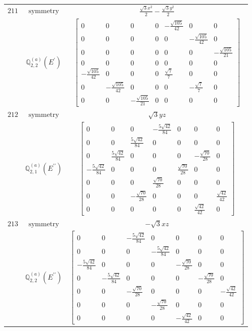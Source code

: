 \documentclass[fleqn,8pt,landscape]{jsarticle}
\begin{document}
\begin{longtable}{ccc}
$ 211 $ & $ \text{symmetry} $ & $ \frac{\sqrt{3} x^{2}}{2} - \frac{\sqrt{3} y^{2}}{2} $ \\
$  $ & $ \mathbb{Q}_{2,2}^{(a)}(E^{\prime}) $ & $ \begin{bmatrix} 0 & 0 & 0 & 0 & - \frac{\sqrt{105}}{42} & 0 & 0 \\ 0 & 0 & 0 & 0 & 0 & - \frac{\sqrt{105}}{42} & 0 \\ 0 & 0 & 0 & 0 & 0 & 0 & - \frac{\sqrt{105}}{21} \\ 0 & 0 & 0 & 0 & 0 & 0 & 0 \\ - \frac{\sqrt{105}}{42} & 0 & 0 & 0 & \frac{\sqrt{7}}{7} & 0 & 0 \\ 0 & - \frac{\sqrt{105}}{42} & 0 & 0 & 0 & - \frac{\sqrt{7}}{7} & 0 \\ 0 & 0 & - \frac{\sqrt{105}}{21} & 0 & 0 & 0 & 0 \end{bmatrix} $ \\ \hline
$ 212 $ & $ \text{symmetry} $ & $ \sqrt{3} y z $ \\
$  $ & $ \mathbb{Q}_{2,1}^{(a)}(E^{\prime\prime}) $ & $ \begin{bmatrix} 0 & 0 & 0 & - \frac{5 \sqrt{42}}{84} & 0 & 0 & 0 \\ 0 & 0 & \frac{5 \sqrt{42}}{84} & 0 & 0 & 0 & 0 \\ 0 & \frac{5 \sqrt{42}}{84} & 0 & 0 & 0 & - \frac{\sqrt{70}}{28} & 0 \\ - \frac{5 \sqrt{42}}{84} & 0 & 0 & 0 & \frac{\sqrt{70}}{28} & 0 & 0 \\ 0 & 0 & 0 & \frac{\sqrt{70}}{28} & 0 & 0 & 0 \\ 0 & 0 & - \frac{\sqrt{70}}{28} & 0 & 0 & 0 & \frac{\sqrt{42}}{42} \\ 0 & 0 & 0 & 0 & 0 & \frac{\sqrt{42}}{42} & 0 \end{bmatrix} $ \\ \hline
$ 213 $ & $ \text{symmetry} $ & $ - \sqrt{3} x z $ \\
$  $ & $ \mathbb{Q}_{2,2}^{(a)}(E^{\prime\prime}) $ & $ \begin{bmatrix} 0 & 0 & - \frac{5 \sqrt{42}}{84} & 0 & 0 & 0 & 0 \\ 0 & 0 & 0 & - \frac{5 \sqrt{42}}{84} & 0 & 0 & 0 \\ - \frac{5 \sqrt{42}}{84} & 0 & 0 & 0 & - \frac{\sqrt{70}}{28} & 0 & 0 \\ 0 & - \frac{5 \sqrt{42}}{84} & 0 & 0 & 0 & - \frac{\sqrt{70}}{28} & 0 \\ 0 & 0 & - \frac{\sqrt{70}}{28} & 0 & 0 & 0 & - \frac{\sqrt{42}}{42} \\ 0 & 0 & 0 & - \frac{\sqrt{70}}{28} & 0 & 0 & 0 \\ 0 & 0 & 0 & 0 & - \frac{\sqrt{42}}{42} & 0 & 0 \end{bmatrix} $ \\ \hline

\end{longtable}
\end{document}

